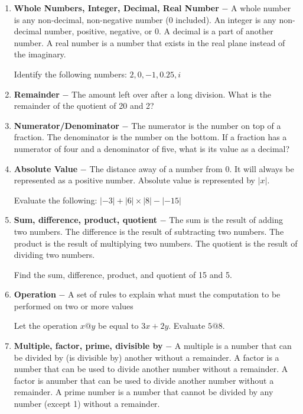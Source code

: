 \documentclass[12pt]{book}
\renewcommand{\indent}{\hspace{1cm}}
\begin{document}
\bigskip
\begin{enumerate}[label=\bfseries\arabic*.]
\item \textbf{Whole Numbers, Integer, Decimal, Real Number} $-$ A whole number is any non-decimal, non-negative number (0 included). An integer is any non-decimal number, positive, negative, or 0. A decimal is a part of another number. A real number is a number that exists in the real plane instead of the imaginary.

\bigskip
\indent Identify the following numbers: $2, 0, -1, 0.25, i$

\vfill\item \textbf{Remainder} $-$ The amount left over after a long division. What is the remainder of the quotient of 20 and 2?

\vfill
\newpage
\item \textbf{Numerator/Denominator} $-$ The numerator is the number on top of a fraction. The denominator is the number on the bottom. If a fraction has a numerator of four and a denominator of five, what is its value as a decimal?

\vfill\item \textbf{Absolute Value} $-$ The distance away of a number from 0. It will always be represented as a positive number. Absolute value is represented by $|x|$.

\bigskip
\indent Evaluate the following: $|-3|+|6|\times|8|-|-15|$

\vfill\item \textbf{Sum, difference, product, quotient} $-$ The sum is the result of adding two numbers. The difference is the result of subtracting two numbers. The product is the result of multiplying two numbers. The quotient is the result of dividing two numbers.

\bigskip
\indent Find the sum, difference, product, and quotient of 15 and 5.

\vfill\item \textbf{Operation} $-$ A set of rules to explain what must the computation to be performed on two or more values

\bigskip
\indent Let the operation $x@y$ be equal to $3x+2y$. Evaluate $5@8$.

\vfill\item \textbf{Multiple, factor, prime, divisible by} $-$ A multiple is a number that can be divided by (is divisible by) another without a remainder. A factor is a number that can be used to divide another number without a remainder. A factor is anumber that can be used to divide another number without a remainder. A prime number is a number that cannot be divided by any number (except 1) without a remainder.


\end{enumerate}
\end{document}
